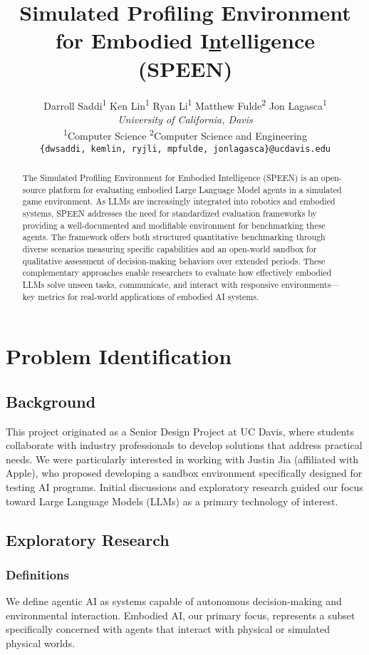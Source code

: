 \documentclass{article}
\title{Simulated Profiling Environment for Embodied I\underline{n}telligence (SPEEN)}
\author{%
    Darroll Saddi\textsuperscript{1} \quad
        Ken Lin\textsuperscript{1} \quad
        Ryan Li\textsuperscript{1} \quad
        Matthew Fulde\textsuperscript{2} \quad
        Jon Lagasca\textsuperscript{1} \vspace{0.75em} \\
        \large{\textit{University of California, Davis}} \\
        \vspace{0.5em}
        \textsuperscript{1}Computer Science \quad
        \textsuperscript{2}Computer Science and Engineering \\
        \texttt{\{dwsaddi, kemlin, ryjli, mpfulde, jonlagasca\}@ucdavis.edu}
    }
\begin{document}
\maketitle

\begin{abstract}
    The Simulated Profiling Environment for Embodied Intelligence (SPEEN) is an open-source platform for evaluating embodied Large Language Model agents in a simulated game environment.
    As LLMs are increasingly integrated into robotics and embodied systems, SPEEN addresses the need for standardized evaluation frameworks by providing a well-documented and modifiable environment for benchmarking these agents.
    The framework offers both structured quantitative benchmarking through diverse scenarios measuring specific capabilities and an open-world sandbox for qualitative assessment of decision-making behaviors over extended periods.
    These complementary approaches enable researchers to evaluate how effectively embodied LLMs solve unseen tasks, communicate, and interact with responsive environments---key metrics for real-world applications of embodied AI systems.
\end{abstract}

\section{Problem Identification}

\subsection{Background}
This project originated as a Senior Design Project at UC Davis, where students collaborate with industry professionals to develop solutions that address practical needs.
We were particularly interested in working with Justin Jia (affiliated with Apple), who proposed developing a sandbox environment specifically designed for testing AI programs.
Initial discussions and exploratory research guided our focus toward Large Language Models (LLMs) as a primary technology of interest.

\subsection{Exploratory Research}

\subsubsection{Definitions}
We define agentic AI as systems capable of autonomous decision-making and environmental interaction.
Embodied AI, our primary focus, represents a subset specifically concerned with agents that interact with physical or simulated physical worlds.
\end{document}
